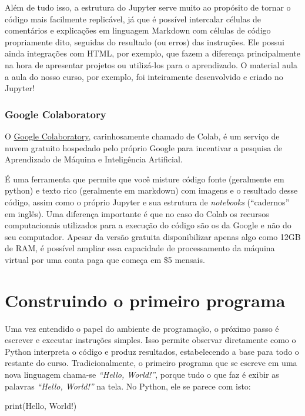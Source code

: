 \documentclass[
  brazilian,
  letterpaper,
  DIV=11,
  numbers=noendperiod]{scrreprt}
\newenvironment{Shaded}{\begin{snugshade}}{\end{snugshade}}
\newcommand{\BuiltInTok}[1]{\textcolor[rgb]{0.00,0.23,0.31}{#1}}
\newcommand{\NormalTok}[1]{\textcolor[rgb]{0.00,0.23,0.31}{#1}}
\newcommand{\StringTok}[1]{\textcolor[rgb]{0.13,0.47,0.30}{#1}}
\begin{document}
Além de tudo isso, a estrutura do Jupyter serve muito ao propósito de
tornar o código mais facilmente replicável, já que é possível intercalar
células de comentários e explicações em linguagem Markdown com células
de código propriamente dito, seguidas do resultado (ou erros) das
instruções. Ele possui ainda integrações com HTML, por exemplo, que
fazem a diferença principalmente na hora de apresentar projetos ou
utilizá-los para o aprendizado. O material aula a aula do nosso curso,
por exemplo, foi inteiramente desenvolvido e criado no Jupyter!

\subsubsection{Google Colaboratory}\label{google-colaboratory}

O \href{https://colab.research.google.com/notebooks/intro.ipynb}{Google
Colaboratory}, carinhosamente chamado de Colab, é um serviço de nuvem
gratuito hospedado pelo próprio Google para incentivar a pesquisa de
Aprendizado de Máquina e Inteligência Artificial.

É uma ferramenta que permite que você misture código fonte (geralmente
em python) e texto rico (geralmente em markdown) com imagens e o
resultado desse código, assim como o próprio Jupyter e sua estrutura de
\emph{notebooks} (``cadernos'' em inglês). Uma diferença importante é
que no caso do Colab os recursos computacionais utilizados para a
execução do código são os da Google e não do seu computador. Apesar da
versão gratuita disponibilizar apenas algo como 12GB de RAM, é possível
ampliar essa capacidade de processamento da máquina virtual por uma
conta paga que começa em \$5 mensais.

\section{Construindo o primeiro
programa}\label{construindo-o-primeiro-programa}

Uma vez entendido o papel do ambiente de programação, o próximo passo é
escrever e executar instruções simples. Isso permite observar
diretamente como o Python interpreta o código e produz resultados,
estabelecendo a base para todo o restante do curso. Tradicionalmente, o
primeiro programa que se escreve em uma nova linguagem chama-se
\emph{``Hello, World!''}, porque tudo o que faz é exibir as palavras
\emph{``Hello, World!''} na tela. No Python, ele se parece com isto:

\begin{Shaded}
\begin{Highlighting}[]
\BuiltInTok{print}\NormalTok{(}\StringTok{\textquotesingle{}Hello, World!\textquotesingle{}}\NormalTok{)}
\end{Highlighting}
\end{Shaded}
\end{document}
